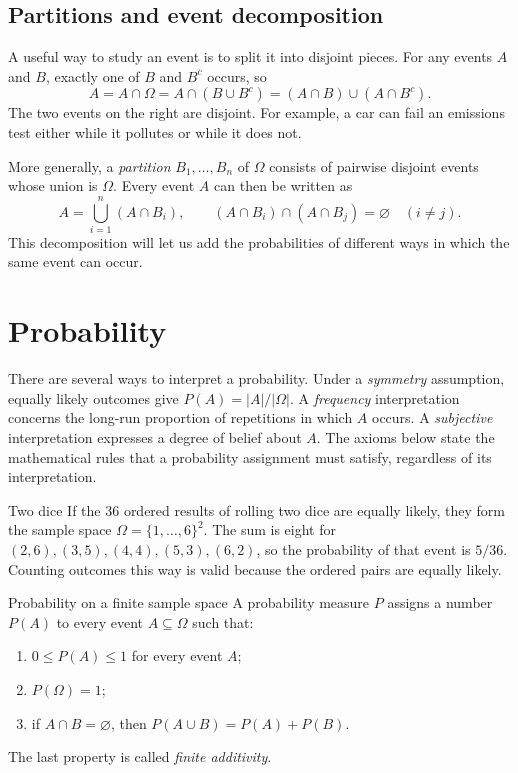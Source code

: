 \documentclass[a4paper,12pt,oneside]{report}
\begin{document}
\subsection{Partitions and event decomposition}

A useful way to study an event is to split it into disjoint pieces. For
any events $A$ and $B$, exactly one of $B$ and $B^c$ occurs, so
\[
  A=A\cap\Omega
   =A\cap(B\cup B^c)
   =(A\cap B)\cup(A\cap B^c).
\]
The two events on the right are disjoint. For example, a car can fail
an emissions test either while it pollutes or while it does not.

More generally, a \emph{partition} $B_1,\ldots,B_n$ of $\Omega$ consists
of pairwise disjoint events whose union is $\Omega$. Every event $A$
can then be written as
\[
  A=\bigcup_{i=1}^{n}(A\cap B_i),
  \qquad
  (A\cap B_i)\cap(A\cap B_j)=\varnothing\quad(i\neq j).
\]
This decomposition will let us add the probabilities of different
ways in which the same event can occur.

\clearpage
\section{Probability}

There are several ways to interpret a probability. Under a
\emph{symmetry} assumption, equally likely outcomes give
$P(A)=|A|/|\Omega|$. A \emph{frequency} interpretation concerns the
long-run proportion of repetitions in which $A$ occurs. A
\emph{subjective} interpretation expresses a degree of belief about
$A$. The axioms below state the mathematical rules that a probability
assignment must satisfy, regardless of its interpretation.

\begin{framedexample}{Two dice}
If the $36$ ordered results of rolling two dice are equally likely,
they form the sample space $\Omega=\{1,\ldots,6\}^2$. The sum is eight for
$(2,6),(3,5),(4,4),(5,3),(6,2)$, so the probability of that event is
$5/36$. Counting outcomes this way is valid because the ordered pairs
are equally likely.
\end{framedexample}

\begin{frameddefn}{Probability on a finite sample space}\label{def:probability-finite}
A probability measure $P$ assigns a number $P(A)$ to every event
$A\subseteq\Omega$ such that:
\begin{enumerate}
  \item $0\leq P(A)\leq 1$ for every event $A$;
  \item $P(\Omega)=1$;
  \item if $A\cap B=\varnothing$, then
        $P(A\cup B)=P(A)+P(B)$.
\end{enumerate}
The last property is called \emph{finite additivity}.
\end{frameddefn}
\end{document}
